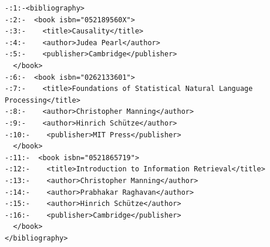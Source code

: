 

\newsavebox\globalOrdering
\begin{lrbox}{\globalOrdering}
\begin{lstlisting}[style=markup]
-:1:-<bibliography>
-:2:-  <book isbn="052189560X">
-:3:-    <title>Causality</title>
-:4:-    <author>Judea Pearl</author>
-:5:-    <publisher>Cambridge</publisher>
  </book>
-:6:-  <book isbn="0262133601">
-:7:-    <title>Foundations of Statistical Natural Language Processing</title>
-:8:-    <author>Christopher Manning</author>
-:9:-    <author>Hinrich Schütze</author>
-:10:-    <publisher>MIT Press</publisher>
  </book>
-:11:-  <book isbn="0521865719">
-:12:-    <title>Introduction to Information Retrieval</title>
-:13:-    <author>Christopher Manning</author>
-:14:-    <author>Prabhakar Raghavan</author>
-:15:-    <author>Hinrich Schütze</author>
-:16:-    <publisher>Cambridge</publisher>
  </book>
</bibliography>
\end{lstlisting}
\end{lrbox}

